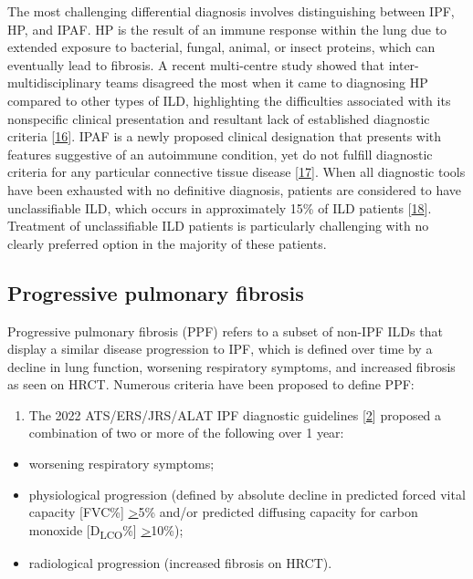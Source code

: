 \documentclass[
]{article}
\providecommand{\tightlist}{%
  \setlength{\itemsep}{0pt}\setlength{\parskip}{0pt}}
\begin{document}
The most challenging differential diagnosis involves distinguishing between IPF, HP, and IPAF. HP is the result of an immune response within the lung due to extended exposure to bacterial, fungal, animal, or insect proteins, which can eventually lead to fibrosis. A recent multi-centre study showed that inter-multidisciplinary teams disagreed the most when it came to diagnosing HP compared to other types of ILD, highlighting the difficulties associated with its nonspecific clinical presentation and resultant lack of established diagnostic criteria {[}\protect\hyperlink{ref-walsh_multicentre_2016}{16}{]}. IPAF is a newly proposed clinical designation that presents with features suggestive of an autoimmune condition, yet do not fulfill diagnostic criteria for any particular connective tissue disease {[}\protect\hyperlink{ref-graney_interstitial_2019}{17}{]}. When all diagnostic tools have been exhausted with no definitive diagnosis, patients are considered to have unclassifiable ILD, which occurs in approximately 15\% of ILD patients {[}\protect\hyperlink{ref-skolnik_unclassifiable_2016}{18}{]}. Treatment of unclassifiable ILD patients is particularly challenging with no clearly preferred option in the majority of these patients.

\hypertarget{progressive-pulmonary-fibrosis}{%
\subsection{Progressive pulmonary fibrosis}\label{progressive-pulmonary-fibrosis}}

Progressive pulmonary fibrosis (PPF) refers to a subset of non-IPF ILDs that display a similar disease progression to IPF, which is defined over time by a decline in lung function, worsening respiratory symptoms, and increased fibrosis as seen on HRCT. Numerous criteria have been proposed to define PPF:

\begin{enumerate}
\def\labelenumi{\arabic{enumi}.}
\tightlist
\item
  The 2022 ATS/ERS/JRS/ALAT IPF diagnostic guidelines {[}\protect\hyperlink{ref-raghu_idiopathic_2022}{2}{]} proposed a combination of two or more of the following over 1 year:
\end{enumerate}

\begin{itemize}
\tightlist
\item
  worsening respiratory symptoms;
\item
  physiological progression (defined by absolute decline in predicted forced vital capacity {[}FVC\%{]} \underline{>}5\% and/or predicted diffusing capacity for carbon monoxide {[}D\textsubscript{LCO}\%{]} \underline{>}10\%);
\item
  radiological progression (increased fibrosis on HRCT).
\end{itemize}
\end{document}

